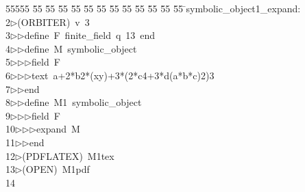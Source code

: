 %
%
\begin{tabbing}
55555 \= 55 \= 55 \= 55 \= 55 \= 55 \= 55 \= 55 \= 55 \= 55 \= 55 \= 55 \= 55 \= \>symbolic\_object1\_expand:\\[0pt]
2\>$\triangleright$\>(ORBITER)\ v\ 3\ \\[0pt]
3\>$\triangleright$\>$\triangleright$\>define\ F\ finite\_field\ q\ 13\ end\ \\[0pt]
4\>$\triangleright$\>$\triangleright$\>define\ M\ symbolic\_object\ \\[0pt]
5\>$\triangleright$\>$\triangleright$\>$\triangleright$\>field\ F\ \\[0pt]
6\>$\triangleright$\>$\triangleright$\>$\triangleright$\>text\ a+2*b2*(xy)+3*(2*c4+3*d(a*b*c)2)3\ \\[0pt]
7\>$\triangleright$\>$\triangleright$\>end\ \\[0pt]
8\>$\triangleright$\>$\triangleright$\>define\ M1\ symbolic\_object\ \\[0pt]
9\>$\triangleright$\>$\triangleright$\>$\triangleright$\>field\ F\ \\[0pt]
10\>$\triangleright$\>$\triangleright$\>$\triangleright$\>expand\ M\ \\[0pt]
11\>$\triangleright$\>$\triangleright$\>end\\[0pt]
12\>$\triangleright$\>(PDFLATEX)\ M1tex\\[0pt]
13\>$\triangleright$\>(OPEN)\ M1pdf\\[0pt]
14\>\end{tabbing}
